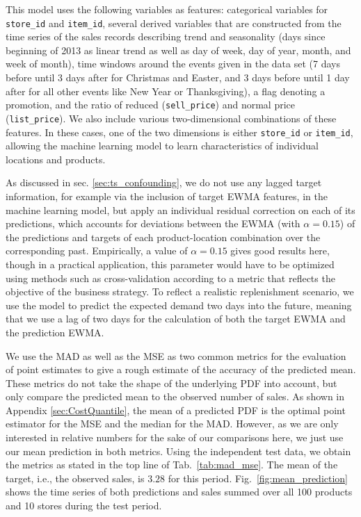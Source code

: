 \documentclass[BCOR=1mm, DIV=calc,10pt,
twoside=true,
twocolumn,
headings=normal]{scrartcl}
\newcommand{\fig}{Fig.~}
\newcommand{\tab}{Tab.~}
\begin{document}
This model uses the following variables as features: categorical variables for \texttt{store\_id} and \texttt{item\_id}, several derived variables that are constructed from the time series of the sales records describing trend and seasonality (days since beginning of 2013 as linear trend as well as day of week, day of year, month, and week of month), time windows around the events given in the data set (7 days before until 3 days after for Christmas and Easter, and 3 days before until 1 day after for all other events like New Year or Thanksgiving), a flag denoting a promotion, and the ratio of reduced (\texttt{sell\_price}) and normal price (\texttt{list\_price}). We also include various two-dimensional combinations of these features. In these cases, one of the two dimensions is either \texttt{store\_id} or \texttt{item\_id}, allowing the machine learning model to learn characteristics of individual locations and products.

\noindent
As discussed in sec. \ref{sec:ts_confounding}, we do not use any lagged target information, for example via the inclusion of target EWMA features, in the machine learning model, but apply an individual residual correction on each of its predictions, which accounts for deviations between the EWMA (with $\alpha=0.15$) of the predictions and targets of each product-location combination over the corresponding past. Empirically, a value of $\alpha=0.15$ gives good results here, though in a practical application, this parameter would have to be optimized using methods such as cross-validation according to a metric that reflects the objective of the business strategy. To reflect a realistic replenishment scenario, we use the model to predict the expected demand two days into the future, meaning that we use a lag of two days for the calculation of both the target EWMA and the prediction EWMA.

We use the MAD as well as the MSE as two common metrics for the evaluation of point estimates to give a rough estimate of the accuracy of the predicted mean. These metrics do not take the shape of the underlying PDF into account, but only compare the predicted mean to the observed number of sales. As shown in Appendix \ref{sec:CostQuantile}, the mean of a predicted PDF is the optimal point estimator for the MSE and the median for the MAD. However, as we are only interested in relative numbers for the sake of our comparisons here, we just use our mean prediction in both metrics. Using the independent test data, we obtain the metrics as stated in the top line of \tab \ref{tab:mad_mse}. The mean of the target, i.e., the observed sales, is $3.28$ for this period. \fig \ref{fig:mean_prediction} shows the time series of both predictions and sales summed over all 100 products and 10 stores during the test period.
\end{document}
